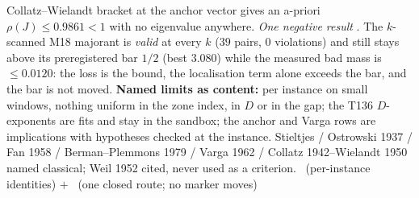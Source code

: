 Collatz--Wielandt bracket at the anchor vector gives an a-priori
$\rho(J)\le0.9861<1$ with no eigenvalue anywhere.
\emph{One negative result} \mX. The $k$-scanned M18 majorant is \emph{valid} at
every $k$ ($39$ pairs, $0$ violations) and still stays above its preregistered
bar $1/2$ (best $3.080$) while the measured bad mass is $\le0.0120$: the loss is
the bound, the localisation term alone exceeds the bar, and the bar is not moved.
\textbf{Named limits as content:} per instance on small windows, nothing uniform
in the zone index, in $D$ or in the gap; the T136 $D$-exponents are fits and stay
in the sandbox; the anchor and Varga rows are implications with hypotheses
checked at the instance.
Stieltjes / Ostrowski 1937 / Fan 1958 / Berman--Plemmons 1979 / Varga 1962 /
Collatz 1942--Wielandt 1950 named classical; Weil 1952 cited, never used as a
criterion.
\mE\ (per-instance identities) $+$ \mX\ (one closed route; no marker moves)



